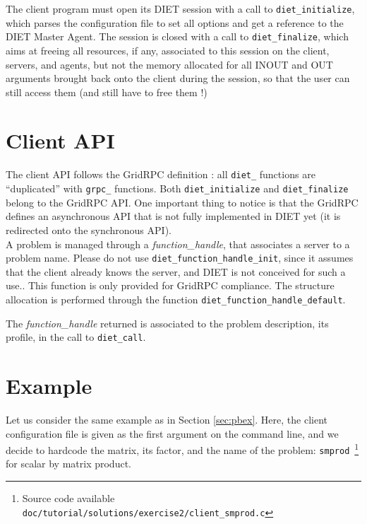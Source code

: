 The client program must open its DIET session with a call to
\texttt{diet\_initialize}, which parses the configuration file to set
all options and get a reference to the DIET Master Agent. The session
is closed with a call to \texttt{diet\_finalize}, which aims at
freeing all resources, if any, associated to this session on the
client, servers, and agents, but not the memory allocated for
all INOUT and OUT arguments brought back onto the client during the
session, so that the user can still access them (and still have to
free them !)


\section{Client API}
\label{sec:clAPI}

The client API follows the GridRPC definition \cite{gridRPC:02}: all
\texttt{diet\_} functions are ``duplicated'' with \texttt{grpc\_}
functions.  Both \texttt{diet\_initialize} and \texttt{diet\_finalize}
belong to the GridRPC API.  One important thing to notice is that the
GridRPC defines an asynchronous API that is not fully implemented in
DIET yet (it is redirected onto the synchronous API).  \\

A problem is managed through a \emph{function\_handle}, that associates a server
to a problem name. Please do not use \texttt{diet\_function\_handle\_init},
since it assumes that the client already knows the server, and DIET is not
conceived for such a use.. This function is only provided for GridRPC
compliance. The structure allocation is performed through the function
\texttt{diet\_function\_handle\_default}.

The \emph{function\_handle} returned is associated to the problem description,
its profile, in the call to \texttt{diet\_call}.

\section{Example}
\label{sec:cl_ex}

Let us consider the same example as in Section \ref{sec:pbex}.  Here, the client
configuration file is given as the first argument on the command line, and we
decide to hardcode the matrix, its factor, and the name of the problem:
\texttt{smprod}~\footnote{Source code available \texttt{doc/tutorial/solutions/exercise2/client\_smprod.c}} for scalar by matrix product.


